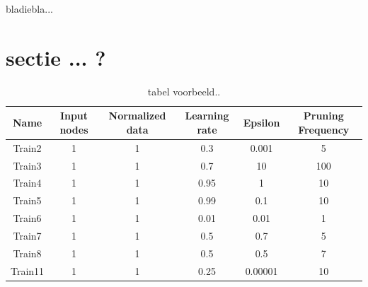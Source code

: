 \documentclass[11pt,fleqn]{book} %
\begin{document}
bladiebla...

\section{sectie ... ?}


\begin{table}[h!]
  \centering
    \begin{tabular}{ c c c c c c }
    \hline\hline
    
    Name & Input nodes & Normalized data & Learning rate & Epsilon & Pruning Frequency\\
    \hline
    
    Train2 & 1 & 1 & 0.3 & 0.001 & 5\\
    Train3 & 1 & 1 & 0.7 & 10 & 100\\
    Train4 & 1 & 1 & 0.95 & 1 & 10\\
    Train5 & 1 & 1 & 0.99 & 0.1 & 10\\
    Train6 & 1 & 1 & 0.01 & 0.01 & 1\\
    Train7 & 1 & 1 & 0.5 & 0.7 & 5\\
    Train8 & 1 & 1 & 0.5 & 0.5 & 7\\
    Train11 & 1 & 1 & 0.25 & 0.00001 & 10\\
    
    \hline
  \end{tabular}
  \caption{tabel voorbeeld..}
  \label{tab:ds9failed}
\end{table}

\cite{book_key}

\end{document}
